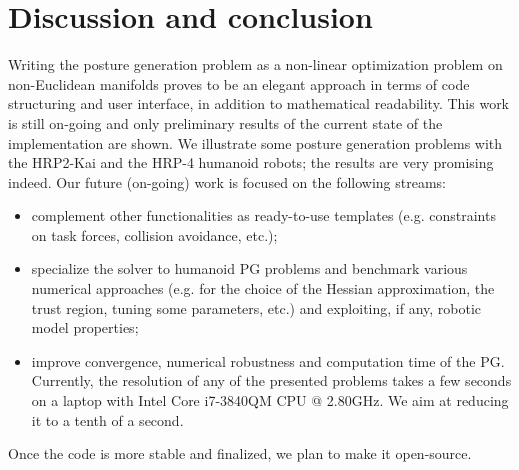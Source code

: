 \section{Discussion and conclusion}
\label{sec:Conclusion}
Writing the posture generation problem as a non-linear optimization problem on non-Euclidean manifolds proves to be an elegant approach in terms of code structuring and user interface, in addition to mathematical readability. This work is still on-going and only preliminary results of the current state of the implementation are shown. We illustrate some posture generation problems with the HRP2-Kai and the HRP-4 humanoid robots; the results are very promising indeed. Our future (on-going) work is focused on the following streams:
\begin{itemize}
\item complement other functionalities as ready-to-use templates (e.g. constraints on task forces, collision avoidance, etc.);
\item specialize the solver to humanoid PG problems and benchmark various numerical approaches (e.g. for the choice of the Hessian approximation, the trust region, tuning some parameters, etc.) and exploiting, if any, robotic model properties;
\item improve convergence, numerical robustness and computation time of the PG. Currently, the resolution of any of the presented problems takes a few seconds on a laptop with Intel Core i7-3840QM CPU @ 2.80GHz. We aim at reducing it to a tenth of a second.
\end{itemize} 
Once the code is more stable and finalized, we plan to make it open-source.
